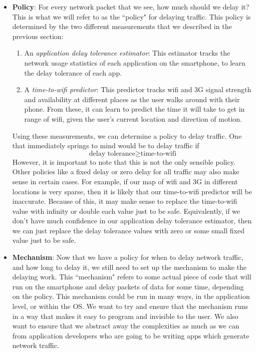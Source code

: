 \documentclass[12pt, fleqn]{article}
\begin{document}
\begin{itemize}
  \item \textbf{Policy}: For every network packet that we see, how much should 
  we delay it? This is what we will refer to as the ``policy" for delaying 
  traffic. This policy is determined by the two different measurements that 
  we described in the previous section:
  \begin{enumerate}
     \item An \emph{application delay tolerance estimator}: This estimator 
     tracks the network usage statistics of each application on the smartphone, 
     to learn the delay tolerance of each app. 
     
    \item A \emph{time-to-wifi predictor}: This predictor tracks wifi and 3G 
    signal strength and availability at different places as the user walks around 
    with their phone. From these, it can learn to predict the time it will take 
    to get in range of wifi, given the user's current location and direction of 
    motion.
  \end{enumerate}
  
  Using these measurements, we can determine a policy to delay traffic. One that immediately
  springs to mind would be to delay traffic if 
  \[\textrm{delay tolerance} \geq \textrm{time-to-wifi} \]
  However, it is important to note that this is not the only sensible policy. 
  Other policies like a fixed delay or zero delay for all traffic may also make sense in certain 
  cases. For example, if our map of wifi and 3G in different locations is very sparse, 
  then it is likely that our time-to-wifi predictor will be inaccurate. Because 
  of this, it may make sense to replace the time-to-wifi value with infinity or double 
  each value just to be safe. Equivalently, if we don't have much confidence in 
  our application delay tolerance estimator, then we can just replace the delay 
  tolerance values with zero or some small fixed value just to be safe. 
  
  \item \textbf{Mechanism}: Now that we have a policy for when to delay network 
  traffic, and how long to delay it, we still need to set up the mechanism to make the delaying 
  work. This ``mechanism" refers to some actual piece of code that will run on 
  the smartphone and delay packets of data for some time, depending on the 
  policy. This mechanism could be run in many ways, in the application level, or 
  within the OS. We want to try and ensure that the mechanism runs in a way that 
  makes it easy to program and invisible to the user. We also want to ensure that we
  abstract away the complexities as much as we can from application developers 
  who are going to be writing apps which generate network traffic.
\end{itemize}
\end{document}
